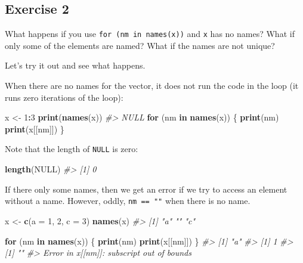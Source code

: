 \documentclass[]{book}
\newenvironment{Shaded}{\begin{snugshade}}{\end{snugshade}}
\newcommand{\CommentTok}[1]{\textcolor[rgb]{0.56,0.35,0.01}{\textit{#1}}}
\newcommand{\ControlFlowTok}[1]{\textcolor[rgb]{0.13,0.29,0.53}{\textbf{#1}}}
\newcommand{\DataTypeTok}[1]{\textcolor[rgb]{0.13,0.29,0.53}{#1}}
\newcommand{\DecValTok}[1]{\textcolor[rgb]{0.00,0.00,0.81}{#1}}
\newcommand{\KeywordTok}[1]{\textcolor[rgb]{0.13,0.29,0.53}{\textbf{#1}}}
\newcommand{\NormalTok}[1]{#1}
\newcommand{\OperatorTok}[1]{\textcolor[rgb]{0.81,0.36,0.00}{\textbf{#1}}}
\newcommand{\OtherTok}[1]{\textcolor[rgb]{0.56,0.35,0.01}{#1}}
\newcommand{\StringTok}[1]{\textcolor[rgb]{0.31,0.60,0.02}{#1}}
\theoremstyle{plain}
\theoremstyle{remark}
\theoremstyle{definition}
\theoremstyle{definition}
\theoremstyle{definition}
\theoremstyle{remark}
\begin{document}
\hypertarget{exercise-2-56}{%
\subsection{Exercise 2}\label{exercise-2-56}}

What happens if you use \texttt{for\ (nm\ in\ names(x))} and \texttt{x}
has no names? What if only some of the elements are named? What if the
names are not unique?

Let's try it out and see what happens.

When there are no names for the vector, it does not run the code in the
loop (it runs zero iterations of the loop):

\begin{Shaded}
\begin{Highlighting}[]
\NormalTok{x <-}\StringTok{ }\DecValTok{1}\OperatorTok{:}\DecValTok{3}
\KeywordTok{print}\NormalTok{(}\KeywordTok{names}\NormalTok{(x))}
\CommentTok{#> NULL}
\ControlFlowTok{for}\NormalTok{ (nm }\ControlFlowTok{in} \KeywordTok{names}\NormalTok{(x)) \{}
  \KeywordTok{print}\NormalTok{(nm)}
  \KeywordTok{print}\NormalTok{(x[[nm]])}
\NormalTok{\}}
\end{Highlighting}
\end{Shaded}

Note that the length of \texttt{NULL} is zero:

\begin{Shaded}
\begin{Highlighting}[]
\KeywordTok{length}\NormalTok{(}\OtherTok{NULL}\NormalTok{)}
\CommentTok{#> [1] 0}
\end{Highlighting}
\end{Shaded}

If there only some names, then we get an error if we try to access an
element without a name. However, oddly, \texttt{nm\ ==\ ""} when there
is no name.

\begin{Shaded}
\begin{Highlighting}[]
\NormalTok{x <-}\StringTok{ }\KeywordTok{c}\NormalTok{(}\DataTypeTok{a =} \DecValTok{1}\NormalTok{, }\DecValTok{2}\NormalTok{, }\DataTypeTok{c =} \DecValTok{3}\NormalTok{)}
\KeywordTok{names}\NormalTok{(x)}
\CommentTok{#> [1] "a" ""  "c"}
\end{Highlighting}
\end{Shaded}

\begin{Shaded}
\begin{Highlighting}[]
\ControlFlowTok{for}\NormalTok{ (nm }\ControlFlowTok{in} \KeywordTok{names}\NormalTok{(x)) \{}
  \KeywordTok{print}\NormalTok{(nm)}
  \KeywordTok{print}\NormalTok{(x[[nm]])}
\NormalTok{\}}
\CommentTok{#> [1] "a"}
\CommentTok{#> [1] 1}
\CommentTok{#> [1] ""}
\CommentTok{#> Error in x[[nm]]: subscript out of bounds}
\end{Highlighting}
\end{Shaded}
\end{document}
